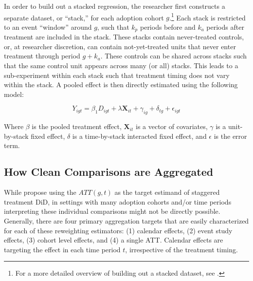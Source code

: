 \documentclass[12pt]{article}
\begin{document}
In order to build out a stacked regression, the researcher first constructs a separate dataset, or  ``stack,'' for each adoption cohort $g$.\footnote{For a more detailed overview of building out a stacked dataset, see \textcite{wing2024stacked}.} Each stack is restricted to an event ``window'' around $g$, such that $k_p$ periods before and $k_a$ periods after treatment are included in the stack. These stacks contain never-treated controls, or, at researcher discretion, can contain not-yet-treated units that never enter treatment through period $g+k_a$. These controls can be shared across stacks such that the same control unit appears across many (or all) stacks. This leads to a sub-experiment within each stack such that treatment timing does not vary within the stack. A pooled effect is then directly estimated using the following model:

\begin{equation}\label{eq:interactive}
    Y_{igt} = \beta_1 D_{igt} + \lambda \mathbf{X}_{it} + \gamma_{ig} + \delta_{tg} + \epsilon_{igt}
\end{equation}

Where $\beta$ is the pooled treatment effect, $\mathbf{X}_{it}$ is a vector of covariates, $\gamma$ is a unit-by-stack fixed effect, $\delta$ is a time-by-stack interacted fixed effect, and $\epsilon$ is the error term.

\subsection{How Clean Comparisons are Aggregated}\label{sec:aggregation}

While \textcite{callaway2021difference} propose using the $ATT(g,t)$ as the target estimand of staggered treatment DiD, in settings with many adoption cohorts and/or time periods interpreting these individual comparisons might not be directly possible. Generally, there are four primary aggregation targets that are easily characterized for each of these reweighting estimators: (1) calendar effects, (2) event study effects, (3) cohort level effects, and (4) a single ATT. Calendar effects are targeting the effect in each time period $t$, irrespective of the treatment timing.
\end{document}
